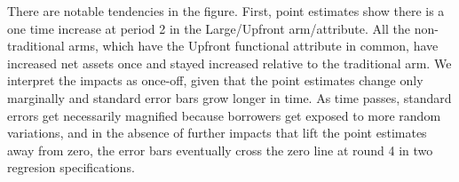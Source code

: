 	There are notable tendencies in the figure. First, point estimates show there is a one time increase at period 2 in the \textsf{Large/Upfront} arm/attribute. %
	All the non-\textsf{traditional} arms, which have the \textsf{Upfront} functional attribute in common, have increased net assets once and stayed increased relative to the \textsf{traditional} arm. We interpret the impacts as once-off, given that the point estimates change only marginally and standard error bars grow longer in time. As time passes, standard errors get necessarily magnified because borrowers get exposed to more random variations, and in the absence of further impacts that lift the point estimates away from zero, the error bars eventually cross the zero line at round 4 in two regresion specifications. %


